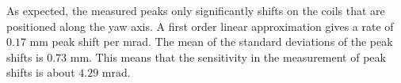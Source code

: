 As expected, the measured peaks only significantly shifts on the coils
that are positioned along the yaw axis. A first order linear approximation
gives a rate of $0.17$ mm peak shift per mrad. The mean of the standard
deviations of the peak shifts is $0.73$ mm. This means that the sensitivity
in the measurement of peak shifts is about $4.29$ mrad.
